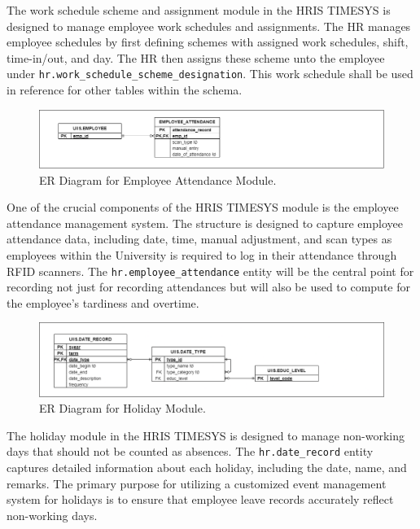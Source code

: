     The work schedule scheme and assignment module in the HRIS TIMESYS is designed to manage employee work schedules and assignments. The HR manages employee schedules by first defining schemes with assigned work schedules, shift, time-in/out, and day. The HR then assigns these scheme unto the employee under \texttt{hr.work\_schedule\_scheme\_designation}. This work schedule shall be used in reference for other tables within the schema.

    \begin{figure}[H]
        \centering
        \includegraphics[width=1\linewidth]{figures/images/diagrams/erd/erd-timesys-employee-attendance.png}
        \caption{ER Diagram for  Employee Attendance Module.}
        \label{fig:erd-timesys-employee-attendance}
    \end{figure}

    One of the crucial components of the HRIS TIMESYS module is the employee attendance management system. The structure is designed to capture employee attendance data, including date, time, manual adjustment, and scan types as employees within the University is required to log in their attendance through RFID scanners. The \texttt{hr.employee\_attendance} entity will be the central point for recording not just for recording attendances but will also be used to compute for the employee's tardiness and overtime.

    \begin{figure}[H]
        \centering
        \includegraphics[width=1\linewidth]{figures/images/diagrams/erd/erd-timesys-holiday.png}
        \caption{ER Diagram for Holiday Module.}
        \label{fig:erd-timesys-holiday}
    \end{figure}

    The holiday module in the HRIS TIMESYS is designed to manage non-working days that should not be counted as absences. The \texttt{hr.date\_record} entity captures detailed information about each holiday, including the date, name, and remarks. The primary purpose for utilizing a customized event management system for holidays is to ensure that employee leave records accurately reflect non-working days. 

